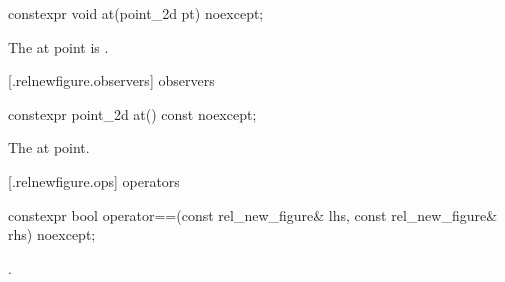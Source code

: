 %
\begin{itemdecl}
constexpr void at(point_2d pt) noexcept;
\end{itemdecl}
\begin{itemdescr}
\pnum
\effects
The at point is .
\end{itemdescr}

 [\iotwod.relnewfigure.observers]{ observers}%

%
\begin{itemdecl}
constexpr point_2d at() const noexcept;
\end{itemdecl}
\begin{itemdescr}
\pnum
\returns
The at point.
\end{itemdescr}

 [\iotwod.relnewfigure.ops]{ operators}%

%
\begin{itemdecl}
constexpr bool operator==(const rel_new_figure& lhs, const rel_new_figure& rhs) 
  noexcept;
\end{itemdecl}
\begin{itemdescr}
\pnum
\returns
{}.
\end{itemdescr}
